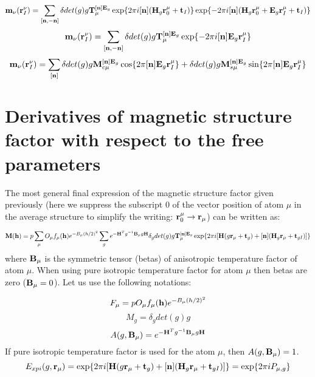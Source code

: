\documentclass[10pt]{article}
\begin{document}
\begin{equation} \label{momentL2}
{\bf m}_\nu({\bf r}_I^{\nu}) =\sum_{[{\bf n},-{\bf n}]}  \delta det(g) g {\bf T}_{\mu}^{[{\bf n}]{\bf E}_g}  \exp\{2\pi i[{\bf n}] ({\bf H}_g{\bf r}_0^\mu+ {\bf t}_I)\} \exp\{-2\pi i[{\bf n}] ({\bf H}_g{\bf r}_0^\mu + {\bf E}_g{\bf r}_I^\mu + {\bf t}_I)\}
\end{equation}
\begin{equation} \label{momentL3}
{\bf m}_\nu({\bf r}_I^{\nu}) =\sum_{[{\bf n},-{\bf n}]}  \delta det(g) g {\bf T}_{\mu}^{[{\bf n}]{\bf E}_g}   \exp\{-2\pi i[{\bf n}] {\bf E}_g{\bf r}_I^\mu\}
\end{equation}
\begin{equation} \label{momentL4}
{\bf m}_\nu({\bf r}_I^{\nu}) =\sum_{[{\bf n}]}  \delta det(g) g {\bf M}_{c\mu}^{[{\bf n}]{\bf E}_g} \cos\{2\pi[{\bf n}] {\bf E}_g{\bf r}_I^\mu\} +  \delta det(g) g {\bf M}_{s\mu}^{[{\bf n}]{\bf E}_g} \sin\{2\pi[{\bf n}] {\bf E}_g{\bf r}_I^\mu\}
\end{equation}

\section{Derivatives of magnetic structure factor with respect to the free parameters}

The most general final expression of the magnetic structure factor given previously (here we suppress the subscript $0$ of the vector position of atom $\mu$ in the average structure to simplify the writing: ${\bf r}_0^\mu \rightarrow {\bf r}_\mu$)  can be written as:

\begin{equation} \label{magstrf_final3}
{\bf M}({\bf h})=p\sum_{{\mu}}  O_{\mu} f_{\mu}({\bf h}) e^{-B_\mu (h/2)^2 } \sum_g e^{-{\bf H}^{T} g^{-1}{\bf B}_\mu g {\bf H}}\delta_g det(g) g {\bf T}_{\mu}^{[{\bf n}]{\bf E}_g}   \exp\{2\pi i [ {\bf H}(g{\bf r}_\mu+{\bf t}_g) + [{\bf n}] ({\bf H}_g{\bf r}_\mu+ {\bf t}_{gI})] \}    
\end{equation}
where ${\bf B}_\mu$ is the symmetric tensor (betas) of anisotropic temperature factor of atom $\mu$. When using pure isotropic temperature factor for atom $\mu$ then betas are zero (${\bf B}_\mu =0$).
Let us use the following notations:

\begin{equation} \label{f_mu}
F_\mu= p O_{\mu} f_{\mu}({\bf h}) e^{-B_\mu (h/2)^2 }
\end{equation}
\begin{equation} \label{mag}
M_g=\delta_g det(g) g
\end{equation}
\begin{equation} \label{anis}
A(g,{\bf B}_\mu)=e^{-{\bf H}^{T} g^{-1}{\bf B}_\mu g {\bf H}}
\end{equation}
If pure isotropic temperature factor is used for the atom $\mu$, then $A(g,{\bf B}_\mu)=1$.
\begin{equation} \label{expi}
E_{xpi}(g,{\bf r}_\mu)= \exp\{2\pi i [ {\bf H}(g{\bf r}_\mu+{\bf t}_g) + [{\bf n}] ({\bf H}_g{\bf r}_\mu+ {\bf t}_{gI})] \} = \exp\{2\pi i P_{\mu,g}\}
\end{equation}
\end{document}
